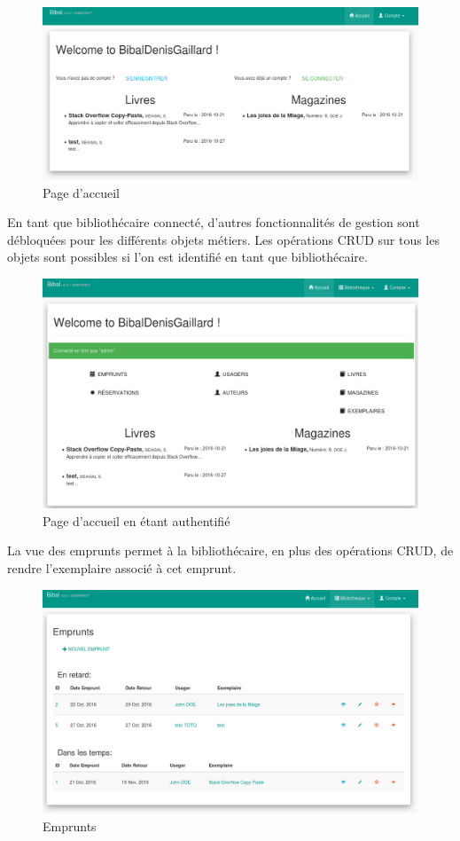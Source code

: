 \documentclass[a4paper,12pt]{article}
\begin{document}
\begin{figure}[htb]
\centering
\includegraphics[width=.9\linewidth]{./res/img/screen-login.png}
\caption{\label{fig:orgparagraph9}
Page d'accueil}
\end{figure}

En tant que bibliothécaire connecté, d’autres fonctionnalités de gestion sont
débloquées pour les différents objets métiers. Les opérations CRUD sur tous
les objets sont possibles si l'on est identifié en tant que bibliothécaire.


\begin{figure}[htb]
\centering
\includegraphics[width=.9\linewidth]{./res/img/screen-logged.png}
\caption{\label{fig:orgparagraph10}
Page d'accueil en étant authentifié}
\end{figure}


La vue des emprunts permet à la bibliothécaire, en plus des opérations CRUD,
de rendre l’exemplaire associé à cet emprunt.

\begin{figure}[htb]
\centering
\includegraphics[width=.9\linewidth]{./res/img/screen-emprunt.png}
\caption{\label{fig:orgparagraph11}
Emprunts}
\end{figure}
\end{document}
